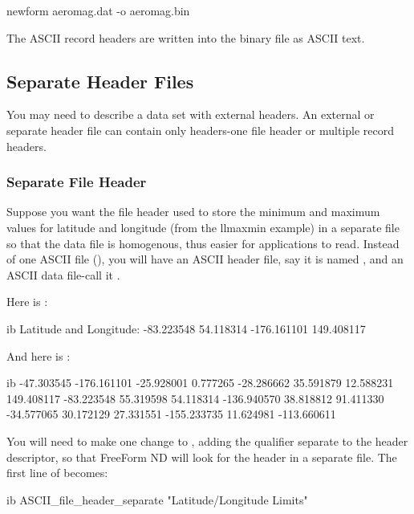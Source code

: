 \begin{example}
newform aeromag.dat -o aeromag.bin 
\end{example}

The ASCII record headers are written into the binary file as ASCII
text.

\subsection{Separate Header Files}

You may need to describe a data set with external headers. An external or separate header file can contain only headers-one file header or multiple record headers. 

\subsubsection{Separate File Header}

Suppose you want the file header used to store the minimum and maximum
values for latitude and longitude (from the llmaxmin example) in a
separate file so that the data file is homogenous, thus easier for
applications to read. Instead of one ASCII file (),
you will have an ASCII header file, say it is named ,
and an ASCII data file-call it .

Here is :

\begin{vcode}{ib}
Latitude and Longitude:   -83.223548 54.118314  -176.161101 149.408117 
\end{vcode}

And here is :

\begin{vcode}{ib}
-47.303545 -176.161101
-25.928001    0.777265
-28.286662   35.591879
 12.588231  149.408117
-83.223548   55.319598
 54.118314 -136.940570
 38.818812   91.411330
-34.577065   30.172129
 27.331551 -155.233735
 11.624981 -113.660611 
\end{vcode}

You will need to make one change to , adding the
qualifier separate to the header descriptor, so that FreeForm ND will
look for the header in a separate file. The first line of
 becomes:

\begin{vcode}{ib}
ASCII_file_header_separate "Latitude/Longitude Limits" 
\end{vcode}

